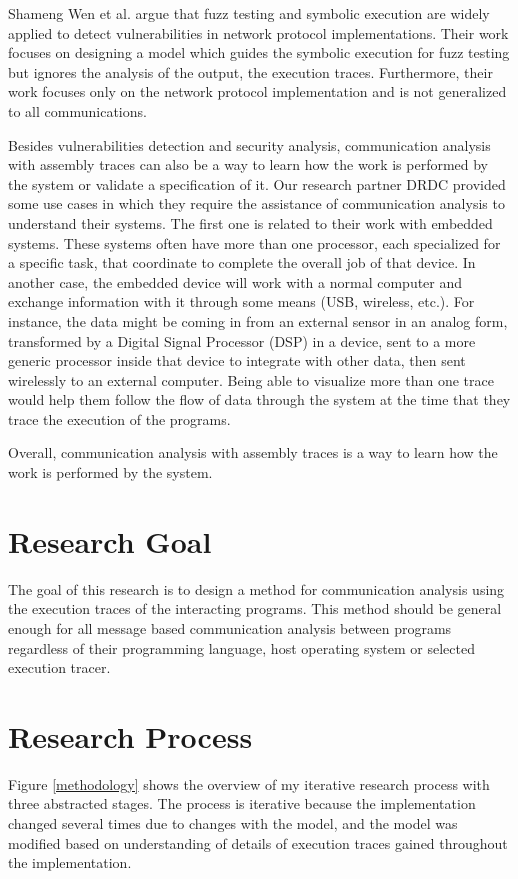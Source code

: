 Shameng Wen et al. argue that fuzz testing and symbolic execution are widely applied to detect vulnerabilities in network protocol implementations. Their work focuses on designing a model which guides the symbolic execution for fuzz testing \cite{wen2017model} but ignores the analysis of the output, the execution traces. Furthermore, their work focuses only on the network protocol implementation and is not generalized to all communications.

Besides vulnerabilities detection and security analysis, communication analysis with assembly traces can also be a way to learn how the work is performed by the system or validate a specification of it. Our research partner DRDC provided some use cases in which they require the assistance of communication analysis to understand their systems. The first one is related to their work with embedded systems. These systems often have more than one processor, each specialized for a specific task, that coordinate to complete the overall job of that device.  In another case, the embedded device will work with a normal computer and exchange information with it through some means
(USB, wireless, etc.).  For instance, the data might be coming in from an external sensor in an analog form, transformed by a Digital Signal Processor (DSP) in a device, sent to a more generic processor inside that device to integrate with other data, then sent wirelessly to an external computer. Being able to visualize more than one trace would help them follow the flow of data through the system at the time that they trace the execution of the programs.

Overall, communication analysis with assembly traces is a way to learn how the work is performed by the system. 

\section{Research Goal}
The goal of this research is to design a method for communication analysis using the execution traces of the interacting programs. This method should be general enough for all message based communication analysis between programs regardless of their programming language, host operating system or selected execution tracer. 

\section{Research Process}
Figure \ref{methodology} shows the overview of my iterative research process with three abstracted stages. The process is iterative because the implementation changed several times due to changes with the model, and the model was modified based on understanding of details of execution traces gained throughout the implementation. 

